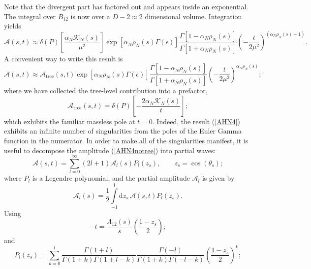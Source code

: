 Note that the divergent part has factored out and appears inside an exponential. The integral over $B_{12}$ is now over a $D - 2 \approx 2$ dimensional volume. Integration yields
\begin{equation}
	\mathcal{A}(s, t) \approx \delta(P) \left[ \frac{\alpha_{N} \mathcal{K}_{N}(s)}{\mu^{2}} \right] \exp{\left[ \alpha_{N} \rho_{N}(s) \Gamma(\epsilon) \right]} \frac{\Gamma[1 - \alpha_{N} \rho_{N}(s)]}{\Gamma[1 + \alpha_{N} \rho_{N}(s)]} \left( - \frac{t}{2 \mu^{2}} \right)^{(\alpha_{N} \rho_{N}(s) - 1)}.
	\label{AHN4notree}
\end{equation}
A convenient way to write this result is
\begin{equation}
	\mathcal{A}(s, t) \approx \mathcal{A}_{\text{tree}}(s, t) \exp{\left[ \alpha_{N} \rho_{N}(s) \Gamma(\epsilon) \right]} \frac{\Gamma[1 - \alpha_{N} \rho_{N}(s)]}{\Gamma[1 + \alpha_{N} \rho_{N}(s)]} \left( - \frac{t}{2 \mu^{2}} \right)^{\alpha_{N} \rho_{N}(s)};
	\label{AHN4}
\end{equation}
where we have collected the tree-level contribution into a prefactor,
\begin{equation}
	\mathcal{A}_{\text{tree}}(s, t) = \delta(P) \left[ - \frac{2 \alpha_{N} \mathcal{K}_{N}(s)}{t} \right];
\end{equation}
which exhibits the familiar massless pole at $t = 0$. Indeed, the result (\ref{AHN4}) exhibits an infinite number of singularities from the poles of the Euler Gamma function in the numerator. In order to make all of the singularities manifest, it is useful to decompose the amplitude (\ref{AHN4notree}) into partial waves:
\begin{equation}
	\mathcal{A}(s, t) = \sum_{l = 0}^{\infty} (2l + 1) \mathcal{A}_{l}(s) P_{l}(z_{s}), \qquad z_{s} = \cos{(\theta_{s})};
\end{equation}
where $P_{l}$ is a Legendre polynomial, and the partial amplitude $\mathcal{A}_{l}$ is given by
\begin{equation}
	\mathcal{A}_{l}(s) = \frac{1}{2} \int\limits_{-1}^{1} \mathrm{d}z_{s} \, \mathcal{A}(s, t) P_{l}(z_{s}).
\end{equation}
Using
\begin{equation}
	{-t} = \frac{\Lambda_{12}(s)}{s} \left( \frac{1 - z_{s}}{2} \right);
\end{equation}
and
\begin{equation}
	P_{l}(z_{s}) = \sum_{k = 0}^{l} \frac{\Gamma(1 + l)}{\Gamma(1 + k) \Gamma(1 + l - k)} \frac{\Gamma(-l)}{\Gamma(1 + k) \Gamma(-l-k)} \left( \frac{1 - z_{s}}{2} \right)^{k};
\end{equation}

